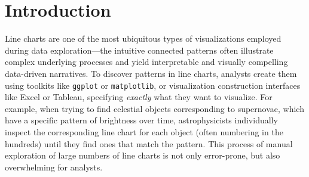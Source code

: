 \section{Introduction\label{sec:intro}}
Line charts are one of the most ubiquitous types
of visualizations employed during data exploration---the 
intuitive connected patterns 
often illustrate complex underlying processes
and yield interpretable and visually compelling data-driven
narratives. 
To discover patterns in line charts,
analysts create them
using toolkits like {\tt ggplot} or {\tt matplotlib},
or visualization construction interfaces
like Excel or Tableau, specifying 
{\em exactly} what they want to visualize.
For example, when trying to find celestial objects 
corresponding to supernovae, which have a specific pattern
of brightness over time, astrophysicists 
individually inspect the corresponding line chart 
for each object (often numbering in the hundreds) 
until they find ones that match the pattern.  
This process of manual exploration of
large numbers of line charts 
is not only error-prone, but also overwhelming for 
analysts.

